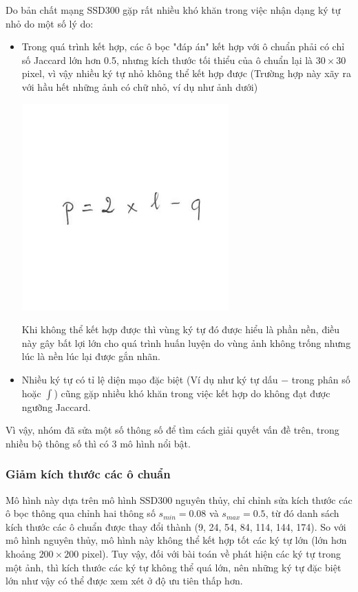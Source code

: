 \documentclass[a4paper,12pt]{article}
\begin{document}
	Do bản chất mạng SSD300\cite{liu2016ssd} gặp rất nhiều khó khăn trong việc nhận dạng ký tự nhỏ do một số lý do:
	\begin{itemize}
		\item Trong quá trình kết hợp, các ô bọc "đáp án" kết hợp với ô chuẩn phải có chỉ số Jaccard\cite{Jaccard} lớn hơn 0.5, nhưng kích thước tối thiểu của ô chuẩn lại là $30 \times 30$ pixel, vì vậy nhiều ký tự nhỏ không thể kết hợp được (Trường hợp này xãy ra với hầu hết những ảnh có chữ nhỏ, ví dụ như ảnh dưới)
		\begin{center}
			\centering
			\includegraphics[resolution=300]{HMER_2017_TEST1_MINH_01_2A.png}
			\vspace{0.5cm}
		\end{center}
		Khi không thể kết hợp được thì vùng ký tự đó được hiểu là phần nền, điều này gây bất lợi lớn cho quá trình huấn luyện do vùng ảnh không trống nhưng lúc là nền lúc lại được gắn nhãn.
		
		\item Nhiều ký tự có tỉ lệ diện mạo đặc biệt (Ví dụ như ký tự dấu $-$ trong phân số hoặc $\int$) cũng gặp nhiều khó khăn trong việc kết hợp do không đạt được ngưỡng Jaccard\cite{Jaccard}.
	\end{itemize}
	
	Vì vậy, nhóm đã sửa một số thông số để tìm cách giải quyết vấn đề trên, trong nhiều bộ thông số thì có 3 mô hình nổi bật.
	
	\subsubsection*{Giảm kích thước các ô chuẩn}
	
	Mô hình này dựa trên mô hình SSD300 nguyên thủy\cite{liu2016ssd}, chỉ chỉnh sửa kích thước các ô bọc thông qua chỉnh hai thông số $s_{min} = 0.08$ và $s_{max} = 0.5$, từ đó danh sách kích thước các ô chuẩn được thay đổi thành (9, 24, 54, 84, 114, 144, 174). So với mô hình nguyên thủy, mô hình này không thể kết hợp tốt các ký tự lớn (lớn hơn khoảng $200 \times 200$ pixel). Tuy vậy, đối với bài toán về phát hiện các ký tự trong một ảnh, thì kích thước các ký tự không thể quá lớn, nên những ký tự đặc biệt lớn như vậy có thể được xem xét ở độ ưu tiên thấp hơn.\\
	
\end{document}
